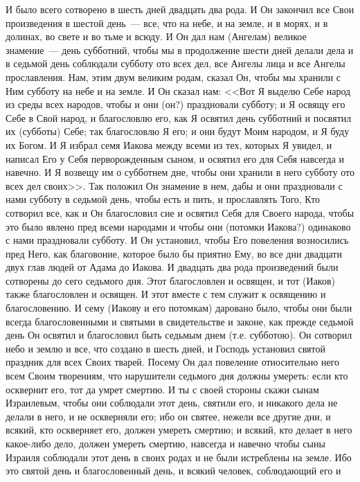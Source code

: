 И было всего сотворено в шесть дней двадцать два рода. И Он закончил все
Свои произведения в шестой день~--- все, что на небе, и на земле, и в морях,
и в долинах, во свете и во тьме и всюду. И Он дал нам (Ангелам) великое
знамение~--- день субботний, чтобы мы в продолжение шести дней делали дела и
в седьмой день соблюдали субботу ото всех дел, все Ангелы лица и все Ангелы
прославления. Нам, этим двум великим родам, сказал Он, чтобы мы хранили с Ним
субботу на небе и на земле. И Он сказал нам: <<Вот Я выделю Себе народ из
среды всех народов, чтобы и они (он?) праздновали субботу; и Я освящу
его Себе в Свой народ, и благословлю его, как Я освятил день субботний и
посвятил их (субботы) Себе; так благословлю Я его; и они будут Моим народом, и
Я буду их Богом. И Я избрал семя Иакова между всеми из тех, которых Я увидел, и
написал Его у Себя перворожденным сыном, и освятил его для Себя навсегда и
навечно. И Я возвещу им о субботнем дне, чтобы они хранили в него субботу ото
всех дел своих>>. Так положил Он знамение в нем, дабы и они праздновали с
нами субботу в седьмой день, чтобы есть и пить, и прославлять Того, Кто
сотворил все, как и Он благословил сие и освятил Себя для Своего народа, чтобы
это было явлено пред всеми народами и чтобы они (потомки Иакова?) одинаково с
нами праздновали субботу. И Он установил, чтобы Его повеления возносились пред
Него, как благовоние, которое было бы приятно Ему, во все дни двадцати двух
глав людей от Адама до Иакова. И двадцать два рода произведений были сотворены
до сего седьмого дня. Этот благословлен и освящен, и тот (Иаков) также
благословлен и освящен. И этот вместе с тем служит к освящению и благословению.
И сему (Иакову и его потомкам) даровано было, чтобы они были всегда
благословенными и святыми в свидетельстве и законе, как прежде седьмой день Он
освятил и благословил быть седьмым днем (т.е. субботою). Он сотворил небо
и землю и все, что создано в шесть дней, и Господь установил святой праздник
для всех Своих тварей. Посему Он дал повеление относительно него всем Своим
творениям, что нарушители седьмого дня должны умереть: если кто
осквернит его, тот да умрет смертию. И ты с своей стороны скажи сынам
Израилевым, чтобы они соблюдали этот день, святили его, и никакого дела не
делали в него, и не оскверняли его; ибо он святее, нежели все другие
дни, и всякий, кто оскверняет его, должен умереть смертию; и всякий, кто делает
в него какое-либо дело, должен умереть смертию, навсегда и навечно чтобы сыны
Израиля соблюдали этот день в своих родах и не были истреблены на земле. Ибо
это святой день и благословенный день, и всякий человек, соблюдающий его и
